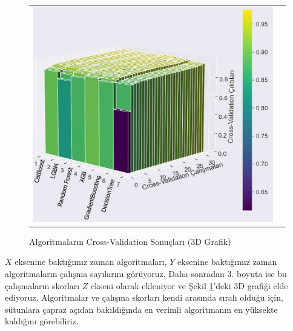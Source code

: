 \documentclass[conference]{IEEEtran}
\begin{document}
\begin{figure}[!h]
	\centering
	\begin{center}
		\begin{tabular}{cc}
			\includegraphics[scale=0.35]{pictures/pic_23.png}&
		\end{tabular}
	\end{center}
	\caption{Algoritmaların Cross-Validation Sonuçları (3D Grafik)}
	\label{fig:23}
\end{figure}

\quad $X$ eksenine baktığımız zaman algoritmaları, $Y$ eksenine baktığımız zaman algoritmaların çalışma sayılarını görüyoruz. Daha sonradan 3. boyuta ise bu çalışmaların skorları $Z$ ekseni olarak ekleniyor ve Şekil \ref{fig:23}'deki 3D grafiği elde ediyoruz. Algoritmalar ve çalışma skorları kendi arasında sıralı olduğu için, sütunlara çapraz açıdan bakıldığında en verimli algoritmanın en yüksekte kaldığını görebiliriz.
\end{document}
